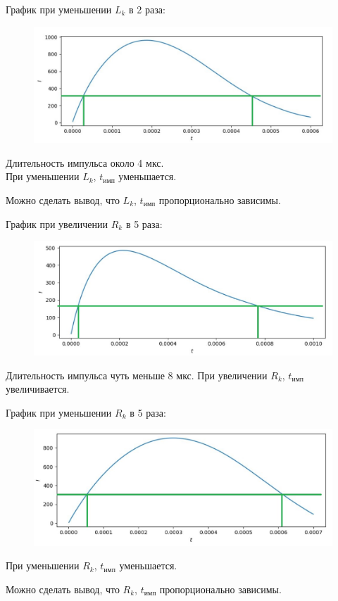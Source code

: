 \documentclass[14pt, a4paper]{extarticle}
\begin{document}
\begin{enumerate}
		График при уменьшении $L_k$ в 2 раза:
		\begin{figure}[h]
			\centering
			\includegraphics[scale=0.8]{graphics/graphs49.jpg}
		\end{figure}\par
		Длительность импульса около 4 мкс.\\
		При уменьшении $L_k$, $t_{\text{имп}}$ уменьшается.\par
		Можно сделать вывод, что $L_k$, $t_{\text{имп}}$ пропорционально зависимы.
		\newpage 
		
		График при увеличении $R_k$ в 5 раза:
		\begin{figure}[h]
			\centering
			\includegraphics[scale=0.8]{graphics/graphs411.jpg}
		\end{figure}\par
		Длительность импульса чуть меньше 8 мкс.
		При увеличении $R_k$, $t_{\text{имп}}$ увеличивается.

		График при уменьшении $R_k$ в 5 раза:
		\begin{figure}[h]
			\centering
			\includegraphics[scale=0.8]{graphics/graphs413.jpg}
		\end{figure}\par
		При уменьшении $R_k$, $t_{\text{имп}}$ уменьшается.\par
		Можно сделать вывод, что $R_k$, $t_{\text{имп}}$ пропорционально зависимы.
		\newpage		
	\end{enumerate}
	
\end{document}
